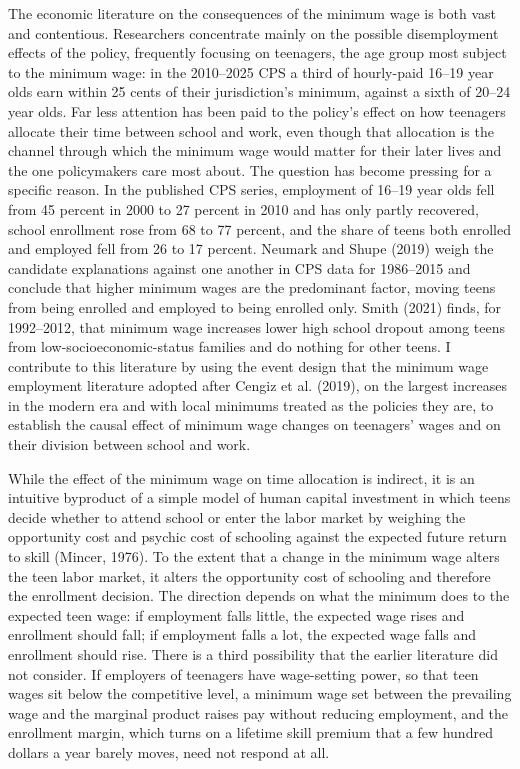\documentclass[12pt]{article}
\begin{document}
The economic literature on the consequences of the minimum wage is both vast and contentious. Researchers concentrate mainly on the possible disemployment effects of the policy, frequently focusing on teenagers, the age group most subject to the minimum wage: in the 2010--2025 CPS a third of hourly-paid 16--19 year olds earn within 25 cents of their jurisdiction's minimum, against a sixth of 20--24 year olds. Far less attention has been paid to the policy's effect on how teenagers allocate their time between school and work, even though that allocation is the channel through which the minimum wage would matter for their later lives and the one policymakers care most about. The question has become pressing for a specific reason. In the published CPS series, employment of 16--19 year olds fell from 45 percent in 2000 to 27 percent in 2010 and has only partly recovered, school enrollment rose from 68 to 77 percent, and the share of teens both enrolled and employed fell from 26 to 17 percent. Neumark and Shupe (2019) weigh the candidate explanations against one another in CPS data for 1986--2015 and conclude that higher minimum wages are the predominant factor, moving teens from being enrolled and employed to being enrolled only. Smith (2021) finds, for 1992--2012, that minimum wage increases lower high school dropout among teens from low-socioeconomic-status families and do nothing for other teens. I contribute to this literature by using the event design that the minimum wage employment literature adopted after Cengiz et al. (2019), on the largest increases in the modern era and with local minimums treated as the policies they are, to establish the causal effect of minimum wage changes on teenagers' wages and on their division between school and work.

While the effect of the minimum wage on time allocation is indirect, it is an intuitive byproduct of a simple model of human capital investment in which teens decide whether to attend school or enter the labor market by weighing the opportunity cost and psychic cost of schooling against the expected future return to skill (Mincer, 1976). To the extent that a change in the minimum wage alters the teen labor market, it alters the opportunity cost of schooling and therefore the enrollment decision. The direction depends on what the minimum does to the expected teen wage: if employment falls little, the expected wage rises and enrollment should fall; if employment falls a lot, the expected wage falls and enrollment should rise. There is a third possibility that the earlier literature did not consider. If employers of teenagers have wage-setting power, so that teen wages sit below the competitive level, a minimum wage set between the prevailing wage and the marginal product raises pay without reducing employment, and the enrollment margin, which turns on a lifetime skill premium that a few hundred dollars a year barely moves, need not respond at all.
\end{document}

